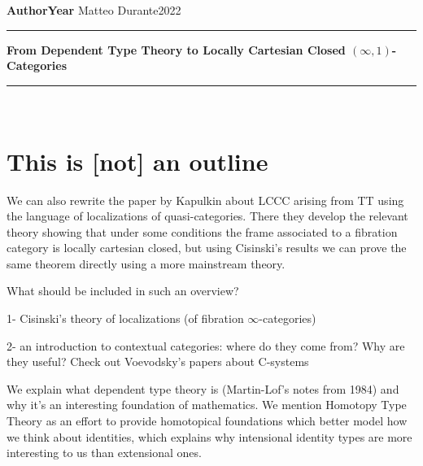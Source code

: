 \documentclass[a4paper,12pt]{scrartcl}
\begin{document}
\noindent\textbf{Author}\hfill\textbf{Year} \linebreak
\vspace*{-.1cm} Matteo Durante\hfill 2022 \\

\noindent
\rule{\linewidth}{1pt}
\begin{center}
\Large
    \textbf{From Dependent Type Theory to Locally Cartesian Closed
    $(\infty,1)$-Categories} \\
\end{center}
\rule{\linewidth}{1pt}
\\


\newcommand{\La}{\Lambda}
\newcommand{\pa}{c}
\newcommand{\ob}{\operatorname{Ob}}
\newcommand{\mor}{\operatorname{Mor}}
\newcommand{\sto}{\twoheadrightarrow}

\newcommand{\plim}{\varprojlim}
\newcommand{\sst}{\subseteq}
\newcommand{\eq}{\operatorname{eq}}

\newcommand{\f}{\varphi}

\newcommand{\sing}{\operatorname{Sing}}

\newcommand{\ihom}{\underline{\Hom}}

\section{This is [not] an outline}

We can also rewrite the paper by Kapulkin about LCCC arising from TT using the
language of localizations of quasi-categories. There they develop the relevant
theory showing that under some conditions the frame associated to a fibration
category is locally cartesian closed, but using Cisinski's results we can prove
the same theorem directly using a more mainstream theory.

What should be included in such an overview?

1- Cisinski's theory of localizations (of fibration $\infty$-categories)

2- an introduction to contextual categories: where do they come from? Why are
they useful? Check out Voevodsky's papers about C-systems

We explain what dependent type theory is (Martin-Lof's notes from 1984) and why
it's an interesting foundation of mathematics. We mention Homotopy Type Theory
as an effort to provide homotopical foundations which better model how we think
about identities, which explains why intensional identity types are more
interesting to us than extensional ones.
\end{document}
